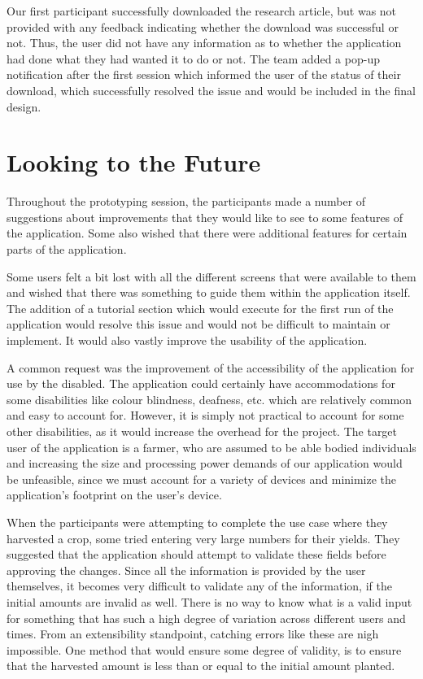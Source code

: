 \documentclass[12pt,letterpaper]{article}
\begin{document}
Our first participant successfully downloaded the research article, but was not provided with any feedback indicating whether the download was successful or not. Thus, the user did not have any information as to whether the application had done what they had wanted it to do or not. The team added a pop-up notification after the first session which informed the user of the status of their download, which successfully resolved the issue and would be included in the final design.

\clearpage
\section{Looking to the Future}
Throughout the prototyping session, the participants made a number of suggestions about improvements that they would like to see to some features of the application. Some also wished that there were additional features for certain parts of the application.\par
Some users felt a bit lost with all the different screens that were available to them and wished that there was something to guide them within the application itself. The addition of a tutorial section which would execute for the first run of the application would resolve this issue and would not be difficult to maintain or implement. It would also vastly improve the usability of the application.\par
A common request was the improvement of the accessibility of the application for use by the disabled. The application could certainly have accommodations for some disabilities like colour blindness, deafness, etc. which are relatively common and easy to account for. However, it is simply not practical to account for some other disabilities, as it would increase the overhead for the project. The target user of the application is a farmer, who are assumed to be able bodied individuals and increasing the size and processing power demands of our application would be unfeasible, since we must account for a variety of devices and minimize the application's footprint on the user's device.\par
When the participants were attempting to complete the use case where they harvested a crop, some tried entering very large numbers for their yields. They suggested that the application should attempt to validate these fields before approving the changes. Since all the information is provided by the user themselves, it becomes very difficult to validate any of the information, if the initial amounts are invalid as well. There is no way to know what is a valid input for something that has such a high degree of variation across different users and times. From an extensibility standpoint, catching errors like these are nigh impossible. One method that would ensure some degree of validity, is to ensure that the harvested amount is less than or equal to the initial amount planted.\par
\end{document}
